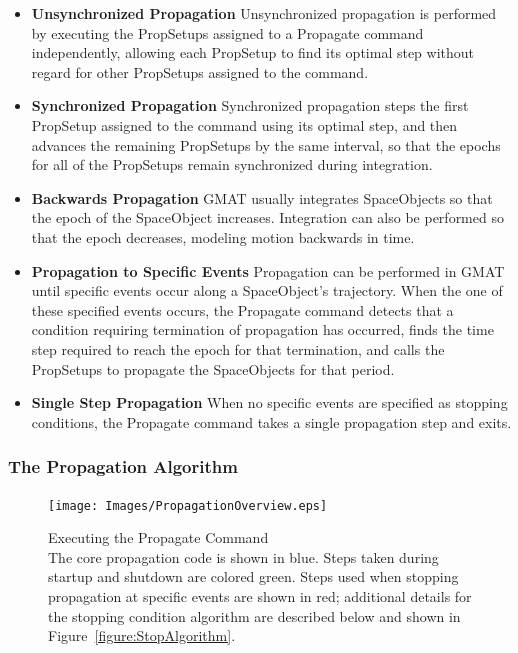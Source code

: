 \begin{itemize}
\item \textbf{Unsynchronized Propagation}  Unsynchronized propagation is performed by executing the
PropSetups assigned to a Propagate command independently, allowing each PropSetup to find its
optimal step without regard for other PropSetups assigned to the command.
\item \textbf{Synchronized Propagation}  Synchronized propagation steps the first PropSetup
assigned to the command using its optimal step, and then advances the remaining PropSetups by the
same interval, so that the epochs for all of the PropSetups remain synchronized during integration.
\item \textbf{Backwards Propagation}  GMAT usually integrates SpaceObjects so that the epoch of the
SpaceObject increases.  Integration can also be performed so that the epoch decreases, modeling
motion backwards in time.
\item \textbf{Propagation to Specific Events}  Propagation can be performed
in GMAT until specific events occur along a SpaceObject's trajectory.  When the one of these
specified events occurs, the Propagate command detects that a condition requiring termination of
propagation has occurred, finds the time step required to reach the epoch for that termination, and
calls the PropSetups to propagate the SpaceObjects for that period.
\item \textbf{Single Step Propagation}  When no specific events are specified as stopping
conditions, the Propagate command takes a single propagation step and exits.
\end{itemize}

\subsubsection{The Propagation Algorithm}

\begin{figure}[htb]
\begin{center}
\texttt{[image: Images/PropagationOverview.eps]}
\begin{quote}
\caption[Executing the Propagate Command]{\label{figure:PropagateExecute}Executing the
Propagate Command\\The core propagation code is shown in blue.  Steps taken during startup and
shutdown are colored green.  Steps used when stopping propagation at specific events are shown in
red; additional details for the stopping condition algorithm are described below and shown in
Figure~\ref{figure:StopAlgorithm}.}
\end{quote}
\end{center}
\end{figure}


